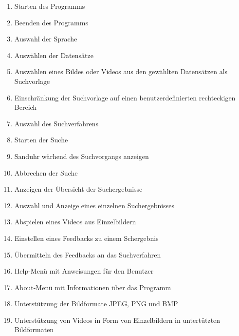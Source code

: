 \begin{enumerate} [label=\bfseries /F \arabic*0/]
	\subsection{Pflicht}
	\item Starten des Programms
	\item Beenden des Programms
	\item Auswahl der Sprache
	\item Ausw\"ahlen der Datens\"atze
	\item Ausw\"ahlen eines Bildes oder Videos aus den gewählten Datensätzen als Suchvorlage
	\item Einschränkung der Suchvorlage auf einen benutzerdefinierten rechteckigen Bereich
	\item Auswahl des Suchverfahrens
	\item Starten der Suche
	\item Sanduhr w\"arhend des Suchvorgangs anzeigen 
	\item Abbrechen der Suche
	\item Anzeigen der \"Ubersicht der Suchergebnisse
	\item Auswahl und Anzeige eines einzelnen Suchergebnisses
	\item Abspielen eines Videos aus Einzelbildern
	\item Einstellen eines Feedbacks zu einem Schergebnis
	\item \"Ubermitteln des Feedbacks an das Suchverfahren
	\item Help-Menü mit Anweisungen für den Benutzer
	\item About-Menü mit Informationen über das Programm
	\item Unterstützung der Bildformate JPEG, PNG und BMP
	\item Unterstützung von Videos in Form von Einzelbildern in untert\"utzten Bildformaten

\end{enumerate}
